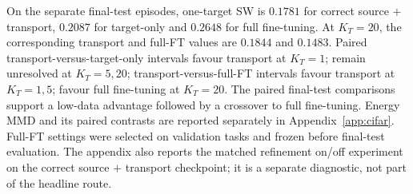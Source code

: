\documentclass{article}
\begin{document}
On the separate final-test episodes, one-target SW is $0.1781$ for correct source $+$ transport, $0.2087$ for target-only and $0.2648$ for full fine-tuning. At $K_T=20$, the corresponding transport and full-FT values are $0.1844$ and $0.1483$. Paired transport-versus-target-only intervals favour transport at $K_T=1$; remain unresolved at $K_T=5,20$; transport-versus-full-FT intervals favour transport at $K_T=1,5$; favour full fine-tuning at $K_T=20$. The paired final-test comparisons support a low-data advantage followed by a crossover to full fine-tuning. Energy MMD and its paired contrasts are reported separately in Appendix~\ref{app:cifar}. Full-FT settings were selected on validation tasks and frozen before final-test evaluation. The appendix also reports the matched refinement on/off experiment on the correct source $+$ transport checkpoint; it is a separate diagnostic, not part of the headline route.
\end{document}
